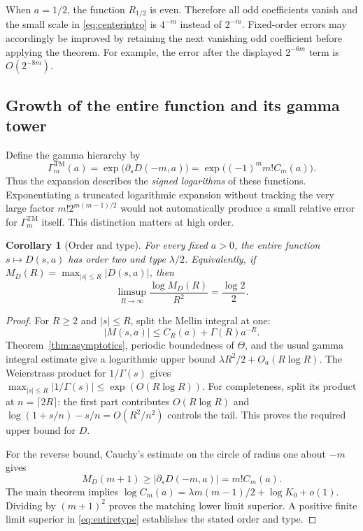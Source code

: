 \documentclass[11pt,letterpaper]{article}
\numberwithin{equation}{section}
\newtheorem{corollary}[theorem]{Corollary}
\theoremstyle{definition}
\theoremstyle{remark}
\begin{document}
When $a=1/2$, the function $R_{1/2}$ is even. Therefore all odd
coefficients vanish and the small scale in \eqref{eq:centerintro} is
$4^{-m}$ instead of $2^{-m}$. Fixed-order errors may accordingly be
improved by retaining the next vanishing odd coefficient before applying
the theorem. For example, the error after the displayed $2^{-6m}$ term is
$O(2^{-8m})$.

\subsection{Growth of the entire function and its gamma tower}
Define the gamma hierarchy by
\begin{equation}\label{eq:Gammadef}
 \Gamma_m^{\mathrm{TM}}(a)
   =\exp\bigl(\partial_sD(-m,a)\bigr)
   =\exp\bigl((-1)^m m!C_m(a)\bigr).
\end{equation}
Thus the expansion describes the \emph{signed logarithms} of these
functions. Exponentiating a truncated logarithmic expansion without
tracking the very large factor $m!2^{m(m-1)/2}$ would not automatically
produce a small relative error for $\Gamma_m^{\mathrm{TM}}$ itself.
This distinction matters at high order.

\begin{corollary}[Order and type]\label{cor:entiretype}
For every fixed $a>0$, the entire function $s\mapsto D(s,a)$ has order two
and type $\lambda/2$. Equivalently, if
$M_D(R)=\max_{|s|\le R}|D(s,a)|$, then
\begin{equation}\label{eq:entiretype}
 \limsup_{R\to\infty}\frac{\log M_D(R)}{R^2}=\frac{\log2}{2}.
\end{equation}
\end{corollary}
\begin{proof}
For $R\ge2$ and $|s|\le R$, split the Mellin integral at one:
\[
 |M(s,a)|\le C_R(a)+\Gamma(R)a^{-R}.
\]
Theorem~\ref{thm:asymptotics}, periodic boundedness of $\Theta$, and the
usual gamma integral estimate give a logarithmic upper bound
$\lambda R^2/2+O_a(R\log R)$.
The Weierstrass product for $1/\Gamma(s)$ gives
$\max_{|s|\le R}|1/\Gamma(s)|\le\exp(O(R\log R))$.
For completeness, split its product at $n=\lceil2R\rceil$:
the first part contributes $O(R\log R)$ and
$\log(1+s/n)-s/n=O(R^2/n^2)$ controls the tail.
This proves the required upper bound for $D$.

For the reverse bound, Cauchy's estimate on the circle of radius one about
$-m$ gives
\[
 M_D(m+1)\ge|\partial_sD(-m,a)|=m!C_m(a).
\]
The main theorem implies
$\log C_m(a)=\lambda m(m-1)/2+\log K_0+o(1)$.
Dividing by $(m+1)^2$ proves the matching lower limit superior.
A positive finite limit superior in \eqref{eq:entiretype} establishes the
stated order and type.
\end{proof}
\end{document}
